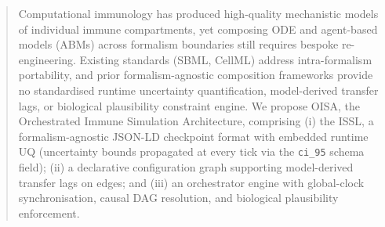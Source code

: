 \documentclass[conference,letterpaper,10pt]{IEEEtran}
\begin{document}
\begin{abstract}
Computational immunology has produced high-quality mechanistic models of
individual immune compartments, yet composing ODE and agent-based models
(ABMs) across formalism boundaries still requires bespoke re-engineering.
Existing standards (SBML, CellML) address intra-formalism portability, and
prior formalism-agnostic composition frameworks provide no standardised
runtime uncertainty quantification, model-derived transfer lags, or
biological plausibility constraint engine. We propose OISA, the Orchestrated
Immune Simulation Architecture, comprising (i) the ISSL, a
formalism-agnostic JSON-LD checkpoint format with embedded runtime UQ
(uncertainty bounds propagated at every tick via the \texttt{ci\_95} schema
field); (ii) a declarative configuration graph supporting model-derived
transfer lags on edges; and (iii) an orchestrator engine with global-clock
synchronisation, causal DAG resolution, and biological plausibility
enforcement.


\end{abstract}
\end{document}
